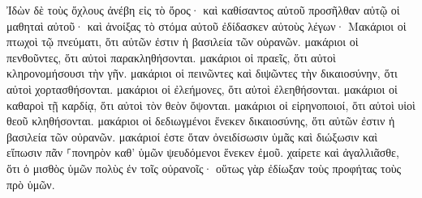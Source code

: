 \documentclass{openreader}
\begin{document}
Ἰδὼν δὲ τοὺς ὄχλους ἀνέβη εἰς τὸ ὄρος· καὶ καθίσαντος αὐτοῦ προσῆλθαν αὐτῷ οἱ μαθηταὶ αὐτοῦ· 
καὶ ἀνοίξας τὸ στόμα αὐτοῦ ἐδίδασκεν αὐτοὺς λέγων· 
Μακάριοι οἱ πτωχοὶ τῷ πνεύματι, ὅτι αὐτῶν ἐστιν ἡ βασιλεία τῶν οὐρανῶν. 
μακάριοι οἱ πενθοῦντες, ὅτι αὐτοὶ παρακληθήσονται. 
μακάριοι οἱ πραεῖς, ὅτι αὐτοὶ κληρονομήσουσι τὴν γῆν. 
μακάριοι οἱ πεινῶντες καὶ διψῶντες τὴν δικαιοσύνην, ὅτι αὐτοὶ χορτασθήσονται. 
μακάριοι οἱ ἐλεήμονες, ὅτι αὐτοὶ ἐλεηθήσονται. 
μακάριοι οἱ καθαροὶ τῇ καρδίᾳ, ὅτι αὐτοὶ τὸν θεὸν ὄψονται. 
μακάριοι οἱ εἰρηνοποιοί, ὅτι αὐτοὶ υἱοὶ θεοῦ κληθήσονται. 
μακάριοι οἱ δεδιωγμένοι ἕνεκεν δικαιοσύνης, ὅτι αὐτῶν ἐστιν ἡ βασιλεία τῶν οὐρανῶν. 
μακάριοί ἐστε ὅταν ὀνειδίσωσιν ὑμᾶς καὶ διώξωσιν καὶ εἴπωσιν πᾶν ⸀πονηρὸν καθ’ ὑμῶν ψευδόμενοι ἕνεκεν ἐμοῦ. 
χαίρετε καὶ ἀγαλλιᾶσθε, ὅτι ὁ μισθὸς ὑμῶν πολὺς ἐν τοῖς οὐρανοῖς· οὕτως γὰρ ἐδίωξαν τοὺς προφήτας τοὺς πρὸ ὑμῶν. 
\end{document}
